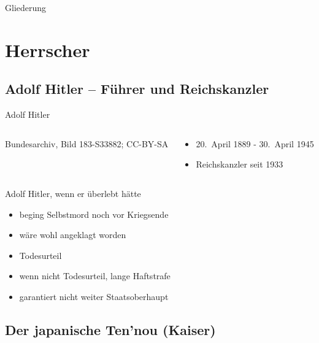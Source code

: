 

\begin{frame}
	\titlepage
\end{frame}

\begin{frame}{Gliederung}
	\tableofcontents
\end{frame}

\section{Herrscher}

\subsection{Adolf Hitler -- Führer und Reichskanzler}

\begin{frame}{Adolf Hitler}
	\begin{columns}
		\begin{column}{0.6\textwidth}
				{Bundesarchiv, Bild 183-S33882; CC-BY-SA}
		\end{column}
		\begin{column}{0.39\textwidth}
			\begin{itemize}
				\item 20.\ April 1889 - 30.\ April 1945
				\item Reichskanzler seit 1933
			\end{itemize}
		\end{column}
	\end{columns}
\end{frame}


\begin{frame}{Adolf Hitler, wenn er überlebt hätte}
	\begin{itemize}
		\item beging Selbstmord noch vor Kriegsende
		\pause
		\item wäre wohl angeklagt worden
		\pause
		\item Todesurteil
		\pause
		\item wenn nicht Todesurteil, lange Haftstrafe
		\item garantiert nicht weiter Staatsoberhaupt
	\end{itemize}
\end{frame}

\subsection[Der Ten’nou]{Der japanische Ten’nou (Kaiser)}

